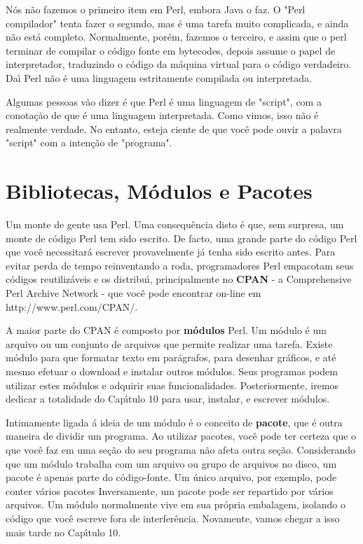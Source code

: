 \documentclass[a4paper,12pt,twoside]{book}
\begin{document}
\noindent N\'os n\~ao fazemos o primeiro item em Perl, embora Java o faz. O "Perl compilador" 
tenta fazer o segundo, mas \'e uma tarefa muito complicada, e ainda n\~ao est\'a completo. 
Normalmente, por\'em, fazemos o terceiro, e assim que o perl terminar de compilar o c\'odigo 
fonte em bytecodes, depois assume o papel de interpretador, traduzindo o c\'odigo da m\'aquina 
virtual para o c\'odigo verdadeiro. Da\'{\i} Perl n\~ao \'e uma linguagem estritamente 
compilada ou interpretada.\medskip

\noindent Algumas pessoas v\~ao dizer \'e que Perl \'e uma linguagem de "script", com a 
conota\c{c}\~ao de que \'e uma linguagem interpretada. Como vimos, isso n\~ao \'e realmente 
verdade. No entanto, esteja ciente de que voc\^e pode ouvir a palavra "script" com a inten\c{c}\~ao 
de "programa".

\section{Bibliotecas, M\'odulos e Pacotes}

\noindent Um monte de gente usa Perl. Uma consequ\^encia disto \'e que, sem surpresa, um monte de 
c\'odigo Perl tem sido escrito. De facto, uma grande parte do c\'odigo Perl que voc\^e necessitar\'a 
escrever provavelmente j\'a tenha sido escrito antes. Para evitar perda de tempo reinventando a roda, 
programadores Perl empacotam seus c\'odigos reutiliz\'aveis e os distribu\'{\i}, principalmente no 
\textbf{CPAN} - a Comprehensive Perl Archive Network - que voc\^e pode encontrar on-line em 
http://www.perl.com/CPAN/.\medskip

\noindent A maior parte do CPAN \'e composto por \textbf{m\'odulos} Perl. Um m\'odulo \'e um 
arquivo ou um conjunto de arquivos que permite realizar uma tarefa. Existe m\'odulo para que 
formatar texto em par\'agrafos, para desenhar gr\'aficos, e at\'e mesmo efetuar o download e 
instalar outros m\'odulos. Seus programas podem utilizar estes m\'odulos e adquirir suas 
funcionalidades. Posteriormente, iremos dedicar a totalidade do Cap\'{\i}tulo 10 para usar, 
instalar, e escrever m\'odulos.\medskip

\noindent Intimamente ligada \'a ideia de um m\'odulo \'e o conceito de \textbf{pacote}, 
que \'e outra maneira de dividir um programa. Ao utilizar pacotes, voc\^e pode ter certeza 
que o que voc\^e faz em uma se\c{c}\~ao do seu programa n\~ao afeta outra se\c{c}\~ao. 
Considerando que um m\'odulo trabalha com um arquivo ou grupo de arquivos no disco, um 
pacote \'e apenas parte do c\'odigo-fonte. Um \'unico arquivo, por exemplo, pode conter 
v\'arios pacotes Inversamente, um pacote pode ser repartido por v\'arios arquivos. Um 
m\'odulo normalmente vive em sua pr\'opria embalagem, isolando o c\'odigo que voc\^e 
escreve fora de interfer\^encia. Novamente, vamos chegar a isso mais tarde no Cap\'{\i}tulo 10.\medskip
\end{document}
